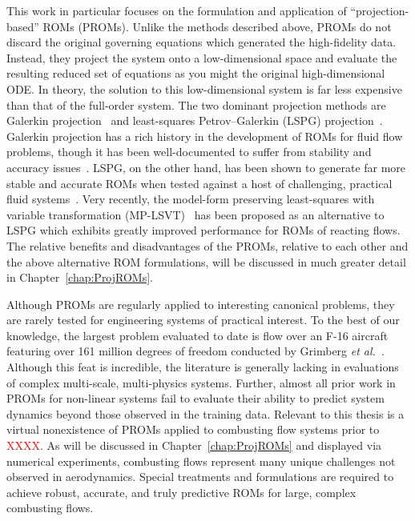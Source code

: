 This work in particular focuses on the formulation and application of  ``projection-based'' ROMs (PROMs). Unlike the methods described above, PROMs do not discard the original governing equations which generated the high-fidelity data. Instead, they project the system onto a low-dimensional space and evaluate the resulting reduced set of equations as you might the original high-dimensional ODE. In theory, the solution to this low-dimensional system is far less expensive than that of the full-order system. The two dominant projection methods are Galerkin projection~\cite{rowleyGpod} and least-squares Petrov--Galerkin (LSPG) projection~\cite{Carlberg2010}. Galerkin projection has a rich history in the development of ROMs for fluid flow problems, though it has been well-documented to suffer from stability and accuracy issues~\cite{Grimberg2020}. LSPG, on the other hand, has been shown to generate far more stable and accurate ROMs when tested against a host of challenging, practical fluid systems~\cite{Carlberg2017}. Very recently, the model-form preserving least-squares with variable transformation (MP-LSVT)~\cite{Huang2022} has been proposed as an alternative to LSPG which exhibits greatly improved performance for ROMs of reacting flows. The relative benefits and disadvantages of the PROMs, relative to each other and the above alternative ROM formulations, will be discussed in much greater detail in Chapter~\ref{chap:ProjROMs}.

Although PROMs are regularly applied to interesting canonical problems, they are rarely tested for engineering systems of practical interest. To the best of our knowledge, the largest problem evaluated to date is flow over an F-16 aircraft featuring over 161 million degrees of freedom conducted by Grimberg \textit{et al.}~\cite{Grimberg2021}. Although this feat is incredible, the literature is generally lacking in evaluations of complex multi-scale, multi-physics systems. Further, almost all prior work in PROMs for non-linear systems fail to evaluate their ability to predict system dynamics beyond those observed in the training data. Relevant to this thesis is a virtual nonexistence of PROMs applied to combusting flow systems prior to \textcolor{red}{XXXX}. As will be discussed in Chapter~\ref{chap:ProjROMs} and displayed via numerical experiments, combusting flows represent many unique challenges not observed in aerodynamics. Special treatments and formulations are required to achieve robust, accurate, and truly predictive ROMs for large, complex combusting flows.